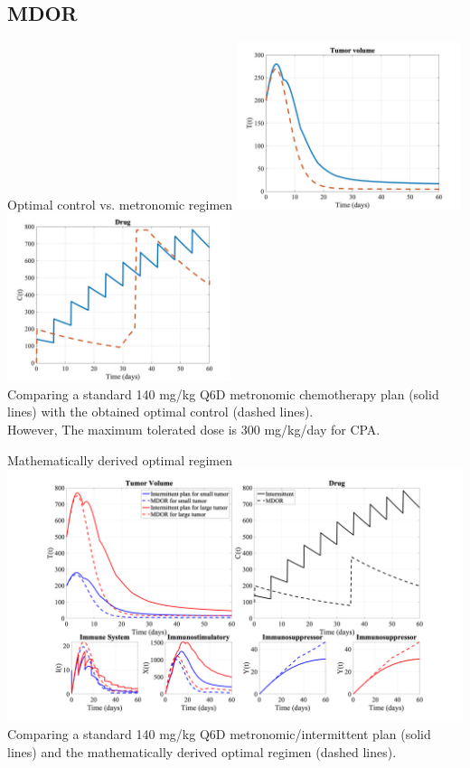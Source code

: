 \documentclass[10pt]{beamer}
\begin{document}
\subsection{MDOR}
\begin{frame}{Optimal control vs. metronomic regimen}
	\includegraphics[width=0.49\textwidth]{chemo-comparison-oc1.jpeg}
	\includegraphics[width=0.49\textwidth]{chemo-comparison-oc2.jpeg} \\
	Comparing a standard 140 mg/kg Q6D metronomic chemotherapy plan (solid lines) with the obtained optimal control (dashed lines). \\ \vspace{0.5cm}
	However, The maximum tolerated dose is 300 mg/kg/day for CPA.
\end{frame}

\begin{frame}{Mathematically derived optimal regimen}
	\includegraphics[width=1\textwidth]{chemo-final.png} \\
	Comparing a standard 140 mg/kg Q6D metronomic/intermittent plan (solid lines) and the mathematically derived optimal regimen (dashed lines). 
\end{frame}
\end{document}
